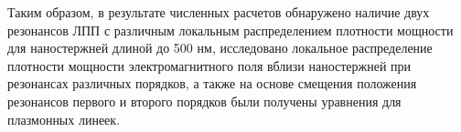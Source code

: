 Таким образом, в результате численных расчетов  обнаружено наличие двух резонансов ЛПП  с различным локальным распределением плотности мощности для наностержней длиной до 500 нм, исследовано локальное распределение плотности мощности электромагнитного поля вблизи наностержней при резонансах различных порядков, а также на основе смещения положения резонансов первого и второго порядков были получены уравнения для плазмонных линеек.

